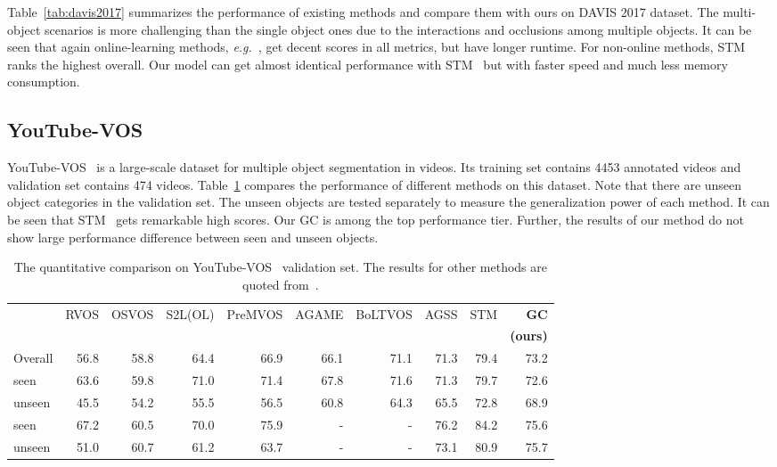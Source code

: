 \documentclass[runningheads]{llncs}
\begin{document}
Table~\ref{tab:davis2017} summarizes the performance of existing methods and compare them with ours on DAVIS 2017 dataset. The multi-object scenarios is more challenging than the single object ones due to the interactions and occlusions among multiple objects. It can be seen that again online-learning methods, \textit{e.g.}~\cite{cinm,premvos}, get decent scores in all metrics, but have longer runtime. For non-online methods, STM~\cite{stm} ranks the highest overall. Our model can get almost identical performance with STM~\cite{stm} but with faster speed and much less memory consumption.

\subsection{YouTube-VOS}

YouTube-VOS~\cite{youtubevos} is a large-scale dataset for multiple object segmentation in videos. Its training set contains 4453 annotated videos and validation set contains 474 videos. Table~\ref{tab:youtubevos} compares the performance of different methods on this dataset. Note that there are unseen object categories in the validation set. The unseen objects are tested separately to measure the generalization power of each method. It can be seen that STM~\cite{stm} gets remarkable high scores. Our GC is among the top performance tier. Further, the results of our method do not show large performance difference between seen and unseen objects.

\begin{table}[tb]
    \centering
    \caption{The quantitative comparison on YouTube-VOS~\cite{youtubevos} validation set. The results for other methods are quoted from~\cite{agss,stm}.}
    \setlength{\tabcolsep}{1.2pt}
    \begin{tabular}{lrrrrrrrrr}
        \toprule
         & RVOS & OSVOS &S2L(OL) & PreMVOS & AGAME &BoLTVOS & AGSS & STM & \textbf{GC} \\
         & \cite{rvos} &\cite{osvos} &\cite{youtubevos} & \cite{premvos} & \cite{agame} &\cite{boltvos} & \cite{agss} & \cite{stm} & \textbf{(ours)} \\
        \midrule
        Overall & 56.8 & 58.8 & 64.4 & 66.9 & 66.1 & 71.1 & 71.3 & 79.4 & 73.2 \\
         seen & 63.6 & 59.8 & 71.0 & 71.4 & 67.8 & 71.6 & 71.3 & 79.7 & 72.6 \\
         unseen& 45.5 & 54.2 & 55.5 & 56.5 & 60.8 & 64.3 & 65.5 & 72.8 & 68.9 \\ 
         seen & 67.2 & 60.5 & 70.0 & 75.9 & - & - & 76.2 & 84.2 & 75.6 \\
         unseen& 51.0 & 60.7 & 61.2 & 63.7 & - & - & 73.1 & 80.9 & 75.7 \\
        \bottomrule
    \end{tabular}
    \label{tab:youtubevos}
\end{table}
\end{document}
